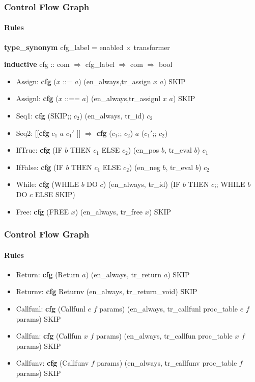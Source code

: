 \begin{frame}[fragile]
\frametitle{Control Flow Graph}
\framesubtitle{Rules}

\textbf{type\_synonym} cfg\_label = enabled $\times$ transformer

\bigskip

\textbf{inductive} cfg :: com $\Rightarrow$ cfg\_label $\Rightarrow$ com $\Rightarrow$ bool

\begin{itemize}
\item{Assign: \textbf{cfg} ($x$ ::= $a$) (en\_always,tr\_assign $x$ $a$) SKIP}
\item{Assignl: \textbf{cfg} ($x$ ::==  $a$) (en\_always,tr\_assignl $x$ $a$) SKIP}
\item{Seq1: \textbf{cfg} (SKIP;; $c_{2}$) (en\_always, tr\_id) $c_{2}$}
\item{Seq2: $[\![$\textbf{cfg} $c_{1}$ $a$ $c_{1}'$ $]\!]$ $\Longrightarrow$ \textbf{cfg} ($c_{1}$;; $c_{2}$) $a$ ($c_{1}'$;; $c_{2}$)}
\item{IfTrue: \textbf{cfg} (IF $b$ THEN $c_{1}$ ELSE $c_{2}$) (en\_pos $b$, tr\_eval $b$) $c_{1}$}
\item{IfFalse: \textbf{cfg} (IF $b$ THEN $c_{1}$ ELSE $c_{2}$) (en\_neg $b$, tr\_eval $b$) $c_{2}$}
\item{While: \textbf{cfg} (WHILE $b$ DO $c$) (en\_always, tr\_id)
  (IF $b$ THEN $c$;; WHILE $b$ DO $c$ ELSE SKIP)}
\item{Free: \textbf{cfg} (FREE $x$) (en\_always, tr\_free $x$) SKIP}
\end{itemize}

\end{frame}


\begin{frame}[fragile]
\frametitle{Control Flow Graph}
\framesubtitle{Rules}

\begin{itemize}
\item{Return: \textbf{cfg} (Return $a$) (en\_always, tr\_return $a$) SKIP}
\item{Returnv: \textbf{cfg} Returnv (en\_always, tr\_return\_void) SKIP}

\item{Callfunl: \textbf{cfg} (Callfunl $e$ $f$ params)
  (en\_always, tr\_callfunl proc\_table $e$ $f$ params) SKIP}
\item{Callfun: \textbf{cfg} (Callfun $x$ $f$ params)
  (en\_always, tr\_callfun proc\_table $x$ $f$ params) SKIP}
\item{Callfunv: \textbf{cfg} (Callfunv $f$ params)
  (en\_always, tr\_callfunv proc\_table $f$ params) SKIP}
\end{itemize}

\end{frame}


